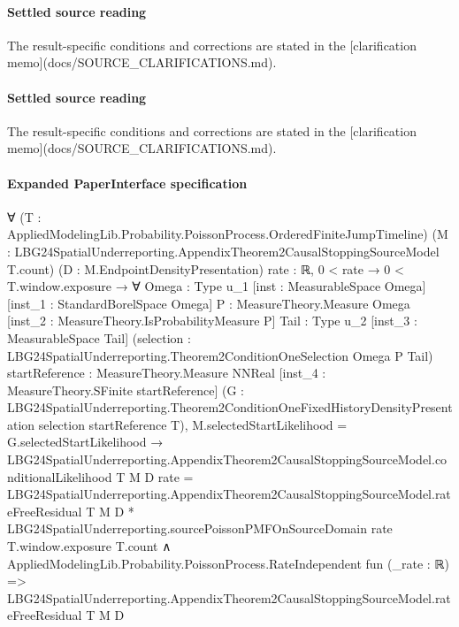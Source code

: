 \documentclass[10pt]{article}
\begin{document}
\paragraph{Settled source reading}
\begin{sloppypar}
The result-\allowbreak{}specific conditions and corrections are stated in the [clarification memo](docs/\allowbreak{}SOURCE\_\allowbreak{}CLARIFICATIONS.\allowbreak{}md).\allowbreak{}
\end{sloppypar}
\paragraph{Settled source reading}
\begin{sloppypar}
The result-\allowbreak{}specific conditions and corrections are stated in the [clarification memo](docs/\allowbreak{}SOURCE\_\allowbreak{}CLARIFICATIONS.\allowbreak{}md).\allowbreak{}
\end{sloppypar}

\paragraph{Expanded PaperInterface specification}
\begin{ReviewVerbatim}
∀ (T : AppliedModelingLib.Probability.PoissonProcess.OrderedFiniteJumpTimeline)
  (M : LBG24SpatialUnderreporting.AppendixTheorem2CausalStoppingSourceModel T.count) (D : M.EndpointDensityPresentation)
  {rate : ℝ},
  0 < rate →
    0 < T.window.exposure →
      ∀ {Omega : Type u_1} [inst : MeasurableSpace Omega] [inst_1 : StandardBorelSpace Omega]
        {P : MeasureTheory.Measure Omega} [inst_2 : MeasureTheory.IsProbabilityMeasure P] {Tail : Type u_2}
        [inst_3 : MeasurableSpace Tail]
        (selection : LBG24SpatialUnderreporting.Theorem2ConditionOneSelection Omega P Tail)
        {startReference : MeasureTheory.Measure NNReal} [inst_4 : MeasureTheory.SFinite startReference]
        (G : LBG24SpatialUnderreporting.Theorem2ConditionOneFixedHistoryDensityPresentation selection startReference T),
        M.selectedStartLikelihood = G.selectedStartLikelihood →
          LBG24SpatialUnderreporting.AppendixTheorem2CausalStoppingSourceModel.conditionalLikelihood T M D rate =
              LBG24SpatialUnderreporting.AppendixTheorem2CausalStoppingSourceModel.rateFreeResidual T M D *
                LBG24SpatialUnderreporting.sourcePoissonPMFOnSourceDomain rate T.window.exposure T.count ∧
            AppliedModelingLib.Probability.PoissonProcess.RateIndependent fun (_rate : ℝ) =>
              LBG24SpatialUnderreporting.AppendixTheorem2CausalStoppingSourceModel.rateFreeResidual T M D
\end{ReviewVerbatim}
\end{document}
